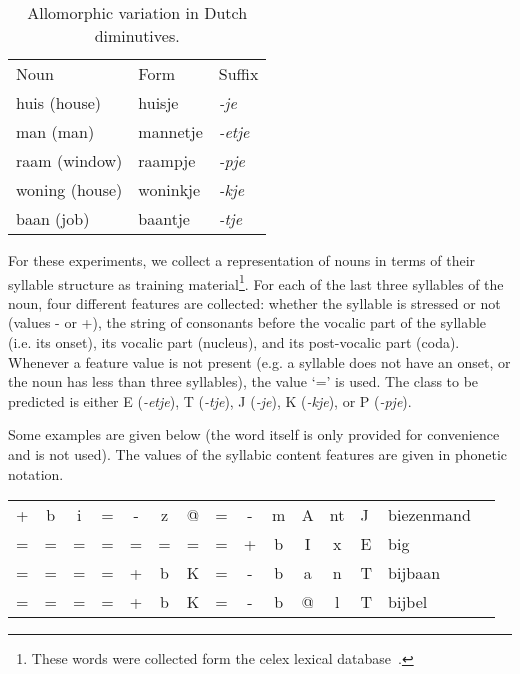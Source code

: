 \documentclass{report}
\begin{document}
\begin{table}[ht]
\begin{center}
\begin{tabular}{l|l|l}
Noun & Form & Suffix \\
\noalign{\smallskip}
\hline
\noalign{\smallskip}
huis (house) & huisje & {\em -je} \\
man (man) & mannetje & {\em -etje\/} \\
raam (window) & raampje & {\em -pje\/} \\
woning (house) & woninkje & {\em -kje\/} \\
baan (job) & baantje & {\em -tje\/} \\
\end{tabular}
\caption{Allomorphic variation in Dutch diminutives.}\label{variation}
\end{center}
\end{table}

For these experiments, we collect a representation of nouns in terms
of their syllable structure as training material\footnote{These words
  were collected form the {\sc celex} lexical
  database~\cite{Baayen+93}.}. For each of the last three syllables of
the noun, four different features are collected: whether the syllable
is stressed or not (values - or +), the string of consonants before
the vocalic part of the syllable (i.e. its onset), its vocalic part
(nucleus), and its post-vocalic part (coda). Whenever a feature value
is not present (e.g. a syllable does not have an onset, or the noun
has less than three syllables), the value `=' is used. The class to be
predicted is either E ({\em -etje}), T ({\em -tje}), J ({\em -je}), K
({\em -kje}), or P ({\em -pje}).

Some examples are given below (the word itself is only provided for
convenience and is not used). The values of the syllabic content
features are given in phonetic notation.

\begin{table}[ht]
\begin{center}
\begin{tabular}{cccccccccccc|l|l|l}
+ & b & i & = & - & z & @ & = & - & m & A & nt & J & biezenmand \\
= & = & = & = & = & = & = & = & + & b & I & x & E & big\\
= & = & = & = & + & b & K & = & - & b & a & n & T & bijbaan\\
= & = & = & = & + & b & K & = & - & b & @ & l & T & bijbel\\
\end{tabular}
\end{center}
\end{table}
\end{document}
